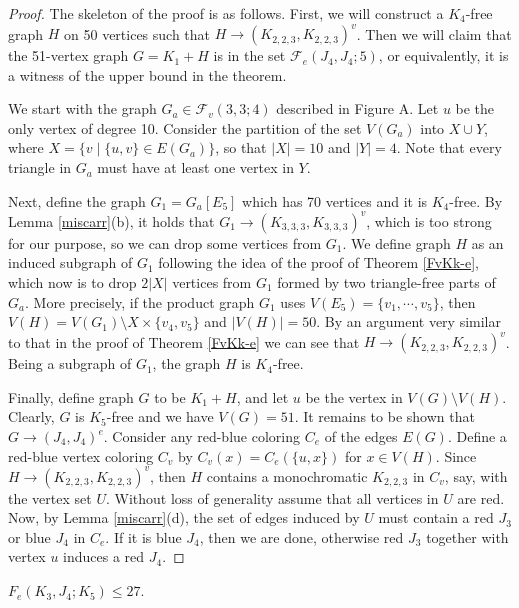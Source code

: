\begin{proof}
The skeleton of the proof is as follows.
First, we will construct a $K_4$-free graph $H$
on 50 vertices such that
$H \rightarrow (K_{2,2,3},K_{2,2,3})^v$.
Then we will claim that the 51-vertex graph
$G=K_1+H$ is in the set $\mathcal{F}_e(J_4,J_4;5)$,
or equivalently, it is a witness of the upper bound
in the theorem.

We start with the graph $G_a \in \mathcal{F}_v(3,3;4)$
described in Figure A.
Let $u$ be the only vertex of degree 10.
Consider the partition of the set $V(G_a)$ into
$X \cup Y$, where
$X=\{v\;|\;\{u,v\}\in E(G_a)\}$,
so that $|X|=10$ and $|Y|=4$.
Note that every triangle in $G_a$ must have
at least one vertex in $Y$.

Next, define the graph $G_1=G_a[E_5]$ which
has 70 vertices and it is $K_4$-free.
By Lemma \ref{miscarr}(b), it holds that
$G_1 \rightarrow (K_{3,3,3},K_{3,3,3})^v$,
which is too strong for our purpose, so we can
drop some vertices from $G_1$.
We define graph $H$ as an induced subgraph
of $G_1$ following the idea of the proof of
Theorem \ref{FvKk-e}, which now is to
drop $2|X|$ vertices from $G_1$ formed
by two triangle-free parts of $G_a$.
More precisely, if the product graph $G_1$ uses
$V(E_5)=\{v_1,\cdots,v_5\}$, then
$V(H)=V(G_1) \setminus X \times \{v_4,v_5\}$
and $|V(H)|=50$.
By an argument very similar to that in the proof
of Theorem \ref{FvKk-e} we can see that
$H \rightarrow (K_{2,2,3},K_{2,2,3})^v$.
Being a subgraph of $G_1$, the graph $H$ is $K_4$-free.

Finally, define graph $G$ to be $K_1+H$, and
let $u$ be the vertex in $V(G) \setminus V(H)$.
Clearly, $G$ is $K_5$-free and we have
$V(G)=51$. It remains to be shown that
$G \rightarrow (J_4,J_4)^e$. Consider any
red-blue coloring $C_e$ of the edges $E(G)$.
Define a red-blue vertex coloring $C_v$
by $C_v(x)=C_e(\{u,x\})$ for $x \in V(H)$.
Since $H \rightarrow (K_{2,2,3},K_{2,2,3})^v$,
then $H$ contains a monochromatic $K_{2,2,3}$
in $C_v$, say, with the vertex set $U$.
Without loss of generality assume that
all vertices in $U$ are red.
Now, by Lemma \ref{miscarr}(d),
the set of edges induced by $U$ must contain
a red $J_3$ or blue $J_4$ in $C_e$.
If it is blue $J_4$, then we are done, otherwise
red $J_3$ together with vertex
$u$ induces a red $J_4$.
\end{proof}

\medskip
\begin{theorem} \label{FvK3J4K5}
$F_e(K_3,J_4; K_5) \leq 27$.
\end{theorem}

